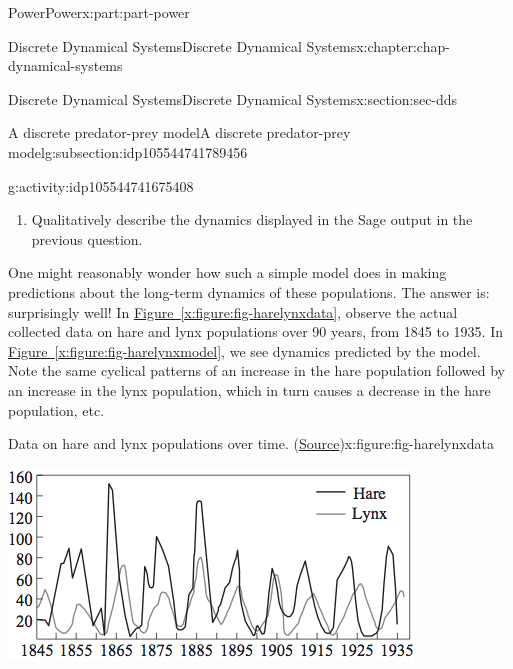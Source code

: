 \documentclass[oneside,10pt,]{book}
\newcommand{\xreffont}{\relax}
\numberwithin{equation}{section}
\begin{document}
\begin{partptx}{Power}{}{Power}{}{}{x:part:part-power}
\begin{chapterptx}{Discrete Dynamical Systems}{}{Discrete Dynamical Systems}{}{}{x:chapter:chap-dynamical-systems}
\begin{sectionptx}{Discrete Dynamical Systems}{}{Discrete Dynamical Systems}{}{}{x:section:sec-dds}
\begin{subsectionptx}{A discrete predator-prey model}{}{A discrete predator-prey model}{}{}{g:subsection:idp105544741789456}
\begin{activity}{}{g:activity:idp105544741675408}
\begin{enumerate}
\begin{sageinput}
def L(n):
	if n==0:
		return L_0
	else:
		return L(n-1) + (c*L(n-1)*H(n-1)-d*L(n-1))/nperiod
time=10
nn=range(time)
HH = [H(n) for n in nn]
LL = [L(n) for n in nn]
nH = list(zip(nn, HH))
nL = list(zip(nn, LL))
H_dots = points(nH, color='blue')
L_dots = points(nL, color='red')
p = H_dots + L_dots
p
\end{sageinput}
%
\item{}Qualitatively describe the dynamics displayed in the Sage output in the previous question.%
\end{enumerate}
\end{activity}%
%
%
One might reasonably wonder how such a simple model does in making predictions about the long-term dynamics of these populations. The answer is: surprisingly well! In \hyperref[x:figure:fig-harelynxdata]{Figure~{\xreffont\ref{x:figure:fig-harelynxdata}}}, observe the actual collected data on hare and lynx populations over 90 years, from 1845 to 1935. In \hyperref[x:figure:fig-harelynxmodel]{Figure~{\xreffont\ref{x:figure:fig-harelynxmodel}}}, we see dynamics predicted by the model. Note the same cyclical patterns of an increase in the hare population followed by an increase in the lynx population, which in turn causes a decrease in the hare population, etc.%
\begin{figureptx}{Data on hare and lynx populations over time. (\href{https://www.cds.caltech.edu/\~murray/amwiki/index.php/Predator_prey}{Source}\protect\footnotemark{})}{x:figure:fig-harelynxdata}{}%
\begin{image}{0.25}{0.5}{0.25}%
\includegraphics[width=\linewidth]{./images/Predprey-graph.png}
\end{image}%

\end{figureptx}
\end{subsectionptx}
\end{sectionptx}
\end{chapterptx}
\end{partptx}
\end{document}
